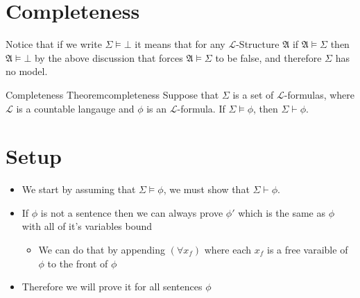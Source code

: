 \section{Completeness}














Notice that if we write $ \Sigma \models \bot $ it means that for any $\mathcal{L}$-Structure $ \mathfrak{ A }   $ if $ \mathfrak{ A } \models \Sigma   $ then $ \mathfrak{ A } \models \bot  $ by the above discussion that forces $ \mathfrak{ A } \models \Sigma   $ to be false, and therefore $ \Sigma  $ has no model.


\begin{theorem}{Completeness Theorem}{completeness}
Suppose that $\Sigma$ is a set of $\mathcal{L}$-formulas, where $ \mathcal{L}$ is a countable langauge  and $\phi$ is an $\mathcal{L}$-formula. If $\Sigma \models \phi$, then $\Sigma \vdash \phi$.

\section*{Setup}

\begin{itemize}
    \item We start by assuming that $ \Sigma \models \phi$, we must show that $ \Sigma \vdash \phi$.
    \item If $ \phi$ is not a sentence then we can always prove $ \phi'$ which is the same as $ \phi$ with all of it's variables bound
    \begin{itemize}
        \item We can do that by appending $ \left( \forall  x _{f}  \right)$ where each $ x_{f}$  is a free varaible of $ \phi$ to the front of $ \phi$ 
    \end{itemize}
\item Therefore we will prove it for all sentences $ \phi$ %
\end{itemize}

\end{theorem}


